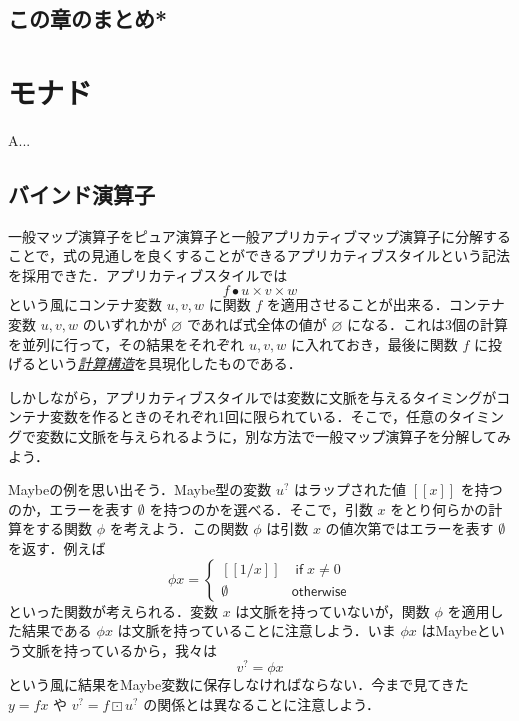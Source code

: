 \documentclass[a4paper]{jsbook}
\def\[{\left[\!\left[}
\def\]{\right]\!\right]}
\newenvironment{leader}{\begingroup}{\endgroup}
\newcommand{\keyword}[1]{{\underline{\emph{#1}}}}
\newcommand{\mMaybeWith}[1]{\[#1\]}
\newcommand{\mNothing}{\emptyset}
\newcommand{\mPureNothing}{\varnothing}
\newcommand{\mKeyword}[1]{\mathsf{#1}}
\newcommand{\mOtherwiseKeyword}{\mKeyword{otherwise}}
\newcommand{\mMaybe}[1]{{#1}^\text{?}}
\DeclareMathOperator{\mMap}{\bullet}
\DeclareMathOperator{\mMapMaybe}{\boxdot}
\DeclareMathOperator{\mAppMap}{\times}
\DeclareMathOperator{\mOtherwise}{\mOtherwiseKeyword}
\newcommand{\mathKeyword}[1]{\operatorname{\textsf{#1}}}
\newcommand{\mathIf}{\mathKeyword{if}}
\begin{document}
\section{この章のまとめ*}

\chapter{モナド}

\begin{leader}
A...
\end{leader}


\section{バインド演算子}


一般マップ演算子をピュア演算子と一般アプリカティブマップ演算子に分解することで，式の見通しを良くすることができるアプリカティブスタイルという記法を採用できた．アプリカティブスタイルでは
\begin{equation}
f\mMap u\mAppMap v\mAppMap w
\end{equation}
という風にコンテナ変数 $u,v,w$ に関数 $f$ を適用させることが出来る．コンテナ変数 $u,v,w$ のいずれかが $\mPureNothing$ であれば式全体の値が $\mPureNothing$ になる．これは3個の計算を並列に行って，その結果をそれぞれ $u,v,w$ に入れておき，最後に関数 $f$ に投げるという\keyword{計算構造}を具現化したものである．

しかしながら，アプリカティブスタイルでは変数に文脈を与えるタイミングがコンテナ変数を作るときのそれぞれ1回に限られている．そこで，任意のタイミングで変数に文脈を与えられるように，別な方法で一般マップ演算子を分解してみよう．

Maybeの例を思い出そう．Maybe型の変数 $\mMaybe{u}$ はラップされた値 $\mMaybeWith{x}$ を持つのか，エラーを表す $\mNothing$ を持つのかを選べる．そこで，引数 $x$ をとり何らかの計算をする関数 $\phi$ を考えよう．この関数 $\phi$ は引数 $x$ の値次第ではエラーを表す $\mNothing$ を返す．例えば
\begin{equation}
\phi x=\begin{cases}
\mMaybeWith{1/x}&\mathIf x\neq0\\
\mNothing&\mOtherwise
\end{cases}
\end{equation}
といった関数が考えられる．変数 $x$ は文脈を持っていないが，関数 $\phi$ を適用した結果である $\phi x$ は文脈を持っていることに注意しよう．いま $\phi x$ はMaybeという文脈を持っているから，我々は
\begin{equation}
\mMaybe{v}=\phi x
\end{equation}
という風に結果をMaybe変数に保存しなければならない．今まで見てきた $y=fx$ や $\mMaybe{v}=f\mMapMaybe\mMaybe{u}$ の関係とは異なることに注意しよう．
\end{document}

